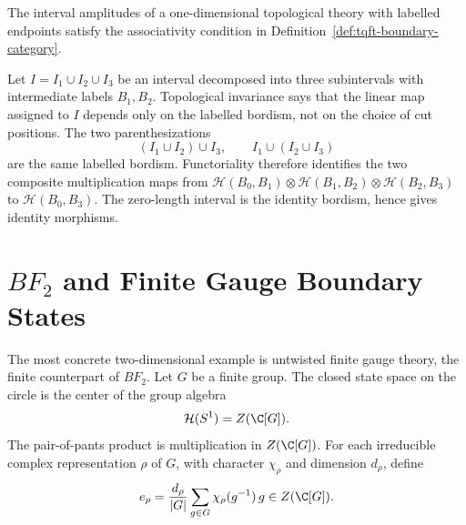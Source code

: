 \begin{remark}
\label{rem:interval-gluing-category}
The interval amplitudes of a one-dimensional topological theory with labelled
endpoints satisfy the associativity condition in
Definition~\ref{def:tqft-boundary-category}.

Let \(I=I_1\cup I_2\cup I_3\) be an interval decomposed into three subintervals
with intermediate labels \(B_1,B_2\).  Topological invariance says that the
linear map assigned to \(I\) depends only on the labelled bordism, not on the
choice of cut positions.  The two parenthesizations
\[
  (I_1\cup I_2)\cup I_3,
  \qquad
  I_1\cup(I_2\cup I_3)
\]
are the same labelled bordism.  Functoriality therefore identifies the two
composite multiplication maps from
\(\mathcal H(B_0,B_1)\otimes\mathcal H(B_1,B_2)\otimes
\mathcal H(B_2,B_3)\) to \(\mathcal H(B_0,B_3)\).  The zero-length interval
is the identity bordism, hence gives identity morphisms.
\end{remark}

\section{\texorpdfstring{\(BF_2\)}{BF2} and Finite Gauge Boundary States}

The most concrete two-dimensional example is untwisted finite gauge theory,
the finite counterpart of \(BF_2\).  Let \(G\) be a finite group.  The closed
state space on the circle is the center of the group algebra
\[
  \mathcal H(S^1)=Z(\C[G]).
\]
The pair-of-pants product is multiplication in \(Z(\C[G])\).  For each
irreducible complex representation \(\rho\) of \(G\), with character
\(\chi_\rho\) and dimension \(d_\rho\), define
\begin{equation}
  e_\rho
  =
  \frac{d_\rho}{|G|}
  \sum_{g\in G}\chi_\rho(g^{-1})\,g
  \in Z(\C[G]).
  \label{eq:finite-bf-two-idempotent}
\end{equation}

